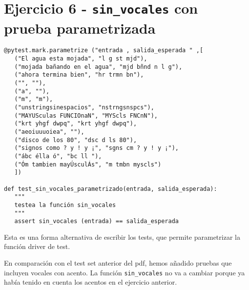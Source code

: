 \newpage
\section{Ejercicio 6 - \texttt{sin\_vocales} con prueba parametrizada}

\begin{lstlisting}
@pytest.mark.parametrize ("entrada , salida_esperada " ,[
   ("El agua esta mojada", "l g st mjd"),
   ("mojada bañando en el agua", "mjd bñnd n l g"),
   ("ahora termina bien", "hr trmn bn"),
   ("", ""),
   ("a", ""),
   ("m", "m"),
   ("unstringsinespacios", "nstrngsnspcs"),
   ("MAYUSculas FUNCIOnaN", "MYScls FNCnN"),
   ("krt yhgf dwpq", "krt yhgf dwpq"),
   ("aeoiuuuoiea", ""),
   ("disco de los 80", "dsc d ls 80"),
   ("signos como ? y ! y ¡", "sgns cm ? y ! y ¡"),
   ("ábc élla ó", "bc ll "),
   ("Óm tambien mayÚsculÁs", "m tmbn myscls")
   ])

def test_sin_vocales_parametrizado(entrada, salida_esperada):
   """
   testea la función sin_vocales
   """
   assert sin_vocales (entrada) == salida_esperada
\end{lstlisting}

Esta es una forma alternativa de escribir los tests, que permite parametrizar la función driver de test.

En comparación con el test set anterior del pdf, hemos añadido pruebas que incluyen vocales con acento. La función \lstinline|sin_vocales| no va a cambiar porque ya había tenido en cuenta los acentos en el ejercicio anterior.



